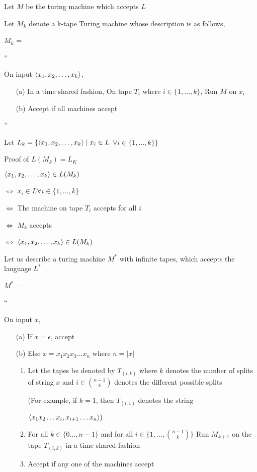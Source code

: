 
Let $M$ be the turing machine which accepts $L$

Let $M_k$ denote a k-tape Turing machine whose description is as follows,

$M_k$ =

``

On input $\langle x_1, x_2, \dots, x_k \rangle$,
    \begin{enumerate}
        \item[(a)] In a time shared fashion, On tape $T_i$ where $i \in \{1,\dots, k \}$, Run $M$ on $x_i$
        \item[(b)] Accept if all machines accept
    \end{enumerate}

''

Let $L_k = \{\langle x_1, x_2, \dots, x_k \rangle \mid x_i \in L$ $\forall i \in \{1,\dots,k \}\}$

Proof of $L(M_k) = L_K$

$ \langle x_1, x_2, \dots, x_k \rangle\in L(M_k)$

$\Leftrightarrow$
$x_i \in L \forall i \in \{1,\dots,k \}$

$\Leftrightarrow$
The machine on tape $T_i$ accepts for all $i$

$\Leftrightarrow$
$M_k$ accepts

$\Leftrightarrow$
$\langle x_1, x_2, \dots, x_k \rangle \in L(M_k)$





Let us describe a turing machine $M^*$ with infinite tapes, which accepts the language $L^*$



$M^*$ = 

``

On input $x$,
    \begin{enumerate}
        \item[(a)] If $ x = \epsilon$, accept
        \item[(b)] Else $x = x_1x_2x_3\dots x_n$ where $n = |x|$
        \begin{enumerate}
            \item Let the tapes be denoted by $T_{(i, k)}$ where $k$ denotes the number of splits of string $x$ and $i \in \binom{n - 1}{k}$ denotes the different possible splits

            (For example, if $k = 1$, then $T_{(i, 1)}$ denotes the string 
            
            $\langle x_1x_2\dots x_i, x_{i +1}\dots x_n\rangle)$


            \item For all $k \in \{0\dots ,n - 1\}$ and for all $i \in \{1,\dots,\binom{n - 1}{k }\}$ Run $M_{k +1}$ on the tape $T_{(i, k)}$ in a time shared fashion
            \item Accept if any one of the machines accept
        \end{enumerate} 
    \end{enumerate}

